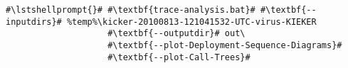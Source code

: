 \begin{lstlisting}[caption=Commands to produce the diagrams under Windows,label=lst:traceAnalysis:sequenceDiagramWin]
#\lstshellprompt{}# #\textbf{trace-analysis.bat}# #\textbf{--inputdirs}# %temp%\kicker-20100813-121041532-UTC-virus-KIEKER
                    #\textbf{--outputdir}# out\
                    #\textbf{--plot-Deployment-Sequence-Diagrams}#
                    #\textbf{--plot-Call-Trees}#		
\end{lstlisting}
